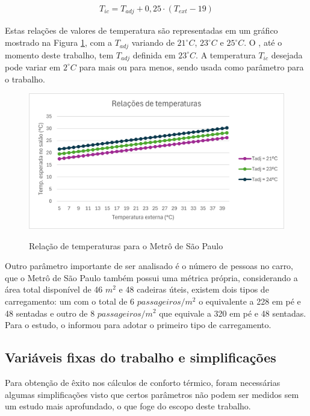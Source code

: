 \documentclass[acronym,symbols,table]{fei}
\begin{document}
\begin{equation} \label{eq:temperaturametro}
\begin{aligned}
{T}_{ic} = {T}_{adj} + {0,25} \cdot ({T}_{ext} - {19})
\end{aligned}
\end{equation}

Estas relações de valores de temperatura são representadas em um gráfico mostrado na Figura \ref{fig:temperatura_norma_metro}, com a $T_{adj}$ variando de ${21}^\circ C$, ${23}^\circ C$ e ${25}^\circ C$. O \textcite{metrosp2024}, até o momento deste trabalho, tem $T_{adj}$ definida em  ${23}^\circ C$. A temperatura $T_{ic}$  desejada pode variar em ${2}^\circ C$ para mais ou para menos, sendo usada como parâmetro para o trabalho.

\begin{figure}[!htb]
\centering
    \caption{Relação de temperaturas para o Metrô de São Paulo}
    \includegraphics[width=0.8\linewidth]{Imagens/Relacoes_de_temperaturas.png}
    \label{fig:temperatura_norma_metro}
\end{figure}

Outro parâmetro importante de ser analisado é o número de pessoas no carro, que o Metrô de São Paulo também possui uma métrica própria, considerando a área total disponível de 46 $m^2$ e 48 cadeiras úteis, existem dois tipos de carregamento: um com o total de ${6}$ $passageiros/m^2$ o equivalente a 228 em pé e 48 sentadas e outro de ${8}$ $passageiros/m^2$ que equivale a 320 em pé e 48 sentadas. Para o estudo, o \textcite{metrosp2024} informou para adotar o primeiro tipo de carregamento.  

\subsection{Variáveis fixas do trabalho e simplificações} \label{simplificacao}

Para obtenção de êxito nos cálculos de conforto térmico, foram necessárias algumas simplificações visto que certos parâmetros não podem ser medidos sem um estudo mais aprofundado, o que foge do escopo deste trabalho. 
\end{document}
